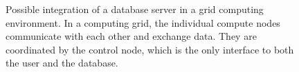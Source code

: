 \begin{figure}[h]
	\centering
	\def\svgwidth{0.8\textwidth}
	
	\caption[Possible integration of a database in a grid computing environment]{
		Possible integration of a database server in a grid computing environment. In
		a computing grid, the individual compute nodes communicate with each other
		and exchange data. They are coordinated by the control node, which is the only
		interface to both the user and the database.
	}
	\label{fig:cluster}
\end{figure}
